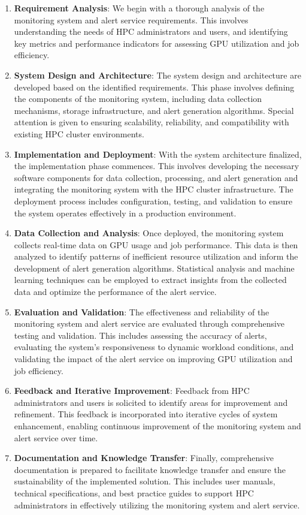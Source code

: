 \begin{enumerate}
    \item \textbf{Requirement Analysis}: We begin with a thorough analysis of the monitoring system and alert service requirements. This involves understanding the needs of HPC administrators and users, and identifying key metrics and performance indicators for assessing GPU utilization and job efficiency.
    \item \textbf{System Design and Architecture}: The system design and architecture are developed based on the identified requirements. This phase involves defining the components of the monitoring system, including data collection mechanisms, storage infrastructure, and alert generation algorithms. Special attention is given to ensuring scalability, reliability, and compatibility with existing HPC cluster environments.
    \item \textbf{Implementation and Deployment}: With the system architecture finalized, the implementation phase commences. This involves developing the necessary software components for data collection, processing, and alert generation and integrating the monitoring system with the HPC cluster infrastructure. The deployment process includes configuration, testing, and validation to ensure the system operates effectively in a production environment.
    \item \textbf{Data Collection and Analysis}: Once deployed, the monitoring system collects real-time data on GPU usage and job performance. This data is then analyzed to identify patterns of inefficient resource utilization and inform the development of alert generation algorithms. Statistical analysis and machine learning techniques can be employed to extract insights from the collected data and optimize the performance of the alert service.
    \item \textbf{Evaluation and Validation}: The effectiveness and reliability of the monitoring system and alert service are evaluated through comprehensive testing and validation. This includes assessing the accuracy of alerts, evaluating the system's responsiveness to dynamic workload conditions, and validating the impact of the alert service on improving GPU utilization and job efficiency.
    \item \textbf{Feedback and Iterative Improvement}: Feedback from HPC administrators and users is solicited to identify areas for improvement and refinement. This feedback is incorporated into iterative cycles of system enhancement, enabling continuous improvement of the monitoring system and alert service over time.
    \item \textbf{Documentation and Knowledge Transfer}: Finally, comprehensive documentation is prepared to facilitate knowledge transfer and ensure the sustainability of the implemented solution. This includes user manuals, technical specifications, and best practice guides to support HPC administrators in effectively utilizing the monitoring system and alert service.
\end{enumerate}

